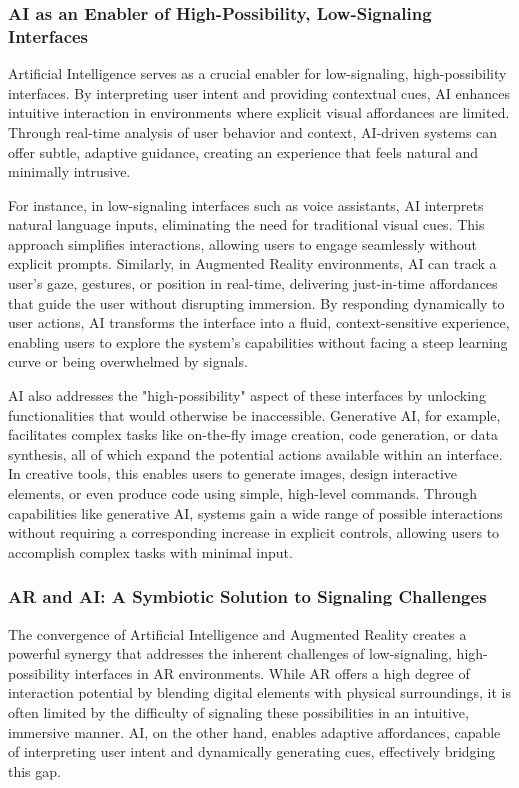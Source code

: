 \subsubsection{ AI as an Enabler of High-Possibility, Low-Signaling Interfaces}

Artificial Intelligence serves as a crucial enabler for low-signaling, high-possibility interfaces\cite{neches1986intelligence}.
By interpreting user intent and providing contextual cues, AI enhances intuitive interaction in environments where explicit visual affordances are limited\cite{9820378}.
Through real-time analysis of user behavior and context, AI-driven systems can offer subtle, adaptive guidance, creating an experience that feels natural and minimally intrusive.

For instance, in low-signaling interfaces such as voice assistants, AI interprets natural language inputs, eliminating the need for traditional visual cues.
This approach simplifies interactions, allowing users to engage seamlessly without explicit prompts.
Similarly, in Augmented Reality environments, AI can track a user’s gaze, gestures, or position in real-time, delivering just-in-time affordances that guide the user without disrupting immersion.
By responding dynamically to user actions, AI transforms the interface into a fluid, context-sensitive experience, enabling users to explore the system’s capabilities without facing a steep learning curve or being overwhelmed by signals.

AI also addresses the "high-possibility" aspect of these interfaces by unlocking functionalities that would otherwise be inaccessible.
Generative AI, for example, facilitates complex tasks like on-the-fly image creation, code generation, or data synthesis, all of which expand the potential actions available within an interface.
In creative tools, this enables users to generate images, design interactive elements, or even produce code using simple, high-level commands.
Through capabilities like generative AI, systems gain a wide range of possible interactions without requiring a corresponding increase in explicit controls, allowing users to accomplish complex tasks with minimal input.

\subsubsection{ AR and AI: A Symbiotic Solution to Signaling Challenges}

The convergence of Artificial Intelligence and Augmented Reality creates a powerful synergy that addresses the inherent challenges of low-signaling, high-possibility interfaces in AR environments.
While AR offers a high degree of interaction potential by blending digital elements with physical surroundings, it is often limited by the difficulty of signaling these possibilities in an intuitive, immersive manner.
AI, on the other hand, enables adaptive affordances, capable of interpreting user intent and dynamically generating cues, effectively bridging this gap.

